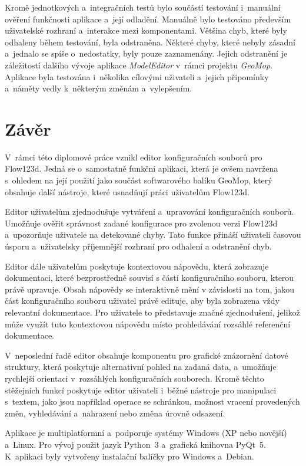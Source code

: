 \documentclass[FM,bw,DP]{tulthesis}
\begin{document}
Kromě jednotkových a~integračních testů bylo součástí testování i~manuální ověření funkčnosti aplikace a~její odladění. Manuálně bylo testováno především uživatelské rozhraní a~interakce mezi komponentami. Většina chyb, které byly odhaleny během testování, byla odstraněna. Některé chyby, které nebyly zásadní a~jednalo se spíše o~nedostatky, byly pouze zaznamenány. Jejich odstranění je záležitostí dalšího vývoje aplikace \textit{ModelEditor} v~rámci projektu \textit{GeoMop}. Aplikace byla testována i~několika cílovými uživateli a~jejich připomínky a~náměty vedly k~některým změnám a~vylepšením.


\chapter*{Závěr}
V~rámci této diplomové práce vznikl editor konfiguračních souborů pro Flow123d. Jedná se o~samostatně funkční aplikaci, která je ovšem navržena s~ohledem na její použití jako součást softwarového balíku GeoMop, který obsahuje další nástroje, které usnadňují práci uživatelům Flow123d.

Editor uživatelům zjednodušuje vytváření a~upravování konfiguračních souborů. Umožňuje ověřit správnost zadané konfigurace pro zvolenou verzi Flow123d a~upozorňuje uživatele na detekované chyby. Tato funkce přináší uživateli časovou úsporu a~uživatelsky příjemnější rozhraní pro odhalení a odstranění chyb.

Editor dále uživatelům poskytuje kontextovou nápovědu, která zobrazuje dokumentaci, které bezprostředně souvisí s částí konfiguračního souboru, kterou právě upravuje. Obsah nápovědy se interaktivně mění v závislosti na tom, jakou část konfiguračního souboru uživatel právě edituje, aby byla zobrazena vždy relevantní dokumentace. Pro uživatele to představuje značné zjednodušení, jelikož může využít tuto kontextovou nápovědu místo prohledávání rozsáhlé referenční dokumentace.

V~neposlední řadě editor obsahuje komponentu pro grafické znázornění datové struktury, která poskytuje alternativní pohled na zadaná data, a~umožňuje rychlejší orientaci v~rozsáhlých konfiguračních souborech. Kromě těchto stěžejních funkcí poskytuje editor uživateli i~běžné nástroje pro manipulaci s~textem, jako jsou například operace se schránkou, možnost vracení provedených změn, vyhledávání a~nahrazení nebo změna úrovně odsazení.

Aplikace je multiplatformní a~podporuje systémy Windows (XP nebo novější) a~Linux. Pro vývoj použit jazyk Python~3 a~grafická knihovna PyQt~5. K~aplikaci byly vytvořeny instalační balíčky pro Windows a~Debian.
\end{document}
